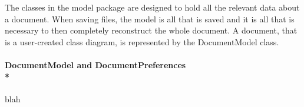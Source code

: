 
\tab The classes in the model package are designed to hold all the relevant data about a
document. When saving files, the model is all that is saved and it is all that is
necessary to then completely reconstruct the whole document. A document, that is a
user-created class diagram, is represented by the DocumentModel class. 
	
\paragraph{\small{\tab DocumentModel and DocumentPreferences\\*}}
blah
